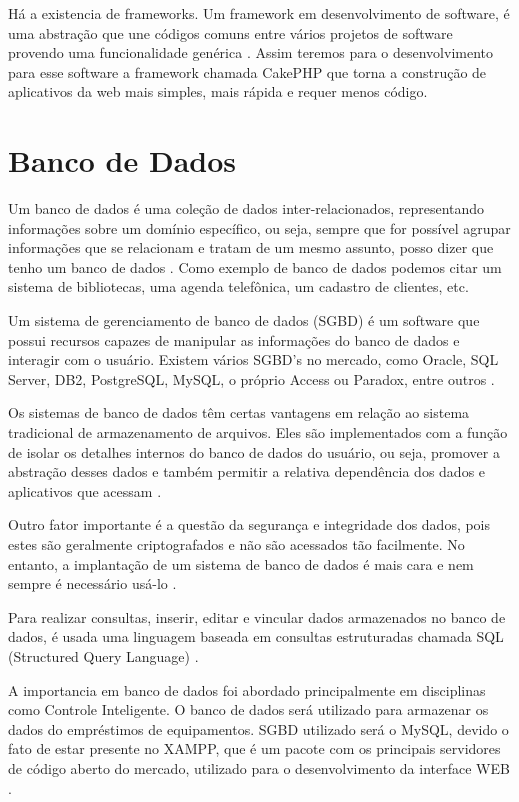 Há a existencia de frameworks. Um framework em desenvolvimento de software, é uma abstração que une códigos comuns entre vários projetos de software provendo uma funcionalidade genérica \cite{WEB3}. Assim teremos para o desenvolvimento para esse software a framework chamada CakePHP \cite{Cake} que  torna a construção de aplicativos da web mais simples, mais rápida e requer menos código. 

\section[Banco de Dados]{Banco de Dados}
Um banco de dados é uma coleção de dados inter-relacionados, representando informações sobre um domínio específico, ou seja, sempre que for possível agrupar informações que se relacionam e tratam de um mesmo assunto, posso dizer que tenho um banco de dados \cite{BD1}. Como exemplo de banco de dados podemos citar um sistema de bibliotecas, uma agenda telefônica, um cadastro de clientes, etc.

Um sistema de gerenciamento de banco de dados (SGBD) é um software que possui recursos capazes de manipular as informações do banco de dados e interagir com o usuário. Existem vários SGBD’s no mercado, como Oracle, SQL Server, DB2, PostgreSQL, MySQL, o próprio Access ou Paradox, entre outros \cite{BD1}.

Os sistemas de banco de dados têm certas vantagens em relação ao sistema tradicional de armazenamento de arquivos. Eles são implementados com a função de isolar os detalhes internos do banco de dados do usuário, ou seja, promover a abstração desses dados e também permitir a relativa dependência dos dados e aplicativos que acessam \cite{BD1}.

Outro fator importante é a questão da segurança e integridade dos dados, pois estes são geralmente criptografados e não são acessados tão facilmente. No entanto, a implantação de um sistema de banco de dados é mais cara e nem sempre é necessário usá-lo \cite{BD1}.

Para realizar consultas, inserir, editar e vincular dados armazenados no banco de dados, é usada uma linguagem baseada em consultas estruturadas chamada SQL (Structured Query Language) \cite{BD1}.

A importancia em banco de dados foi abordado principalmente em disciplinas como Controle Inteligente. O banco de dados será  utilizado para armazenar os dados do empréstimos de equipamentos. SGBD utilizado será o MySQL, devido o fato de estar presente no XAMPP, que é um pacote com os principais servidores de código aberto do mercado, utilizado para o desenvolvimento da interface WEB \cite{BD2}.



